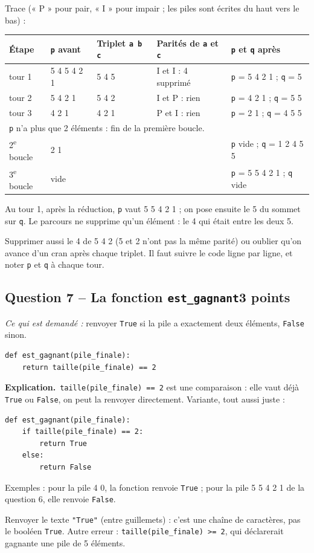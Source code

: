 \documentclass[11pt, a4paper]{exam}
\newcommand{\code}[1]{\texttt{#1}}
\newcommand{\Qt}[2]{\subsection*{#1\hfill{\normalfont\small #2}}}
\newcommand{\rappel}[1]{\noindent\textit{Ce qui est demandé :} #1\par\smallskip}
\newcommand{\explication}{\noindent\textbf{Explication.}\ }
\begin{document}
Trace (« P » pour pair, « I » pour impair ; les piles sont écrites du haut vers le bas) :
\begin{center}\small
\begin{tabular}{|l|l|l|l|l|}\hline
Étape & \code{p} avant & Triplet \code{a b c} & Parités de \code{a} et \code{c} & \code{p} et \code{q} après \\\hline
tour 1 & 5 4 5 4 2 1 & 5 4 5 & I et I : 4 supprimé & \code{p} = 5 4 2 1 ; \code{q} = 5 \\
tour 2 & 5 4 2 1 & 5 4 2 & I et P : rien & \code{p} = 4 2 1 ; \code{q} = 5 5 \\
tour 3 & 4 2 1 & 4 2 1 & P et I : rien & \code{p} = 2 1 ; \code{q} = 4 5 5 \\\hline
\multicolumn{5}{|l|}{\code{p} n'a plus que 2 éléments : fin de la première boucle.} \\\hline
2\textsuperscript{e} boucle & 2 1 & & & \code{p} vide ; \code{q} = 1 2 4 5 5 \\
3\textsuperscript{e} boucle & vide & & & \code{p} = 5 5 4 2 1 ; \code{q} vide \\\hline
\end{tabular}
\end{center}
Au tour 1, après la réduction, \code{p} vaut 5 5 4 2 1 ; on pose ensuite le 5 du sommet sur \code{q}.
Le parcours ne supprime qu'un élément : le 4 qui était entre les deux 5.

\begin{erreur}
Supprimer aussi le 4 de 5 4 2 (5 et 2 n'ont pas la même parité) ou oublier qu'on avance d'un cran après chaque triplet. Il faut suivre le code ligne par ligne, et noter \code{p} et \code{q} à chaque tour.
\end{erreur}

\Qt{Question 7 -- La fonction \code{est\_gagnant}}{3 points}
\rappel{renvoyer \code{True} si la pile a exactement deux éléments, \code{False} sinon.}
\begin{reponse}
\begin{lstlisting}
def est_gagnant(pile_finale):
    return taille(pile_finale) == 2
\end{lstlisting}
\end{reponse}
\explication \code{taille(pile\_finale) == 2} est une comparaison : elle vaut déjà \code{True} ou \code{False}, on peut la renvoyer directement. Variante, tout aussi juste :
\begin{lstlisting}
def est_gagnant(pile_finale):
    if taille(pile_finale) == 2:
        return True
    else:
        return False
\end{lstlisting}
Exemples : pour la pile 4 0, la fonction renvoie \code{True} ; pour la pile 5 5 4 2 1 de la question 6, elle renvoie \code{False}.

\begin{erreur}
Renvoyer le texte \code{"True"} (entre guillemets) : c'est une chaîne de caractères, pas le booléen \code{True}. Autre erreur : \code{taille(pile\_finale) >= 2}, qui déclarerait gagnante une pile de 5 éléments.
\end{erreur}
\end{document}
